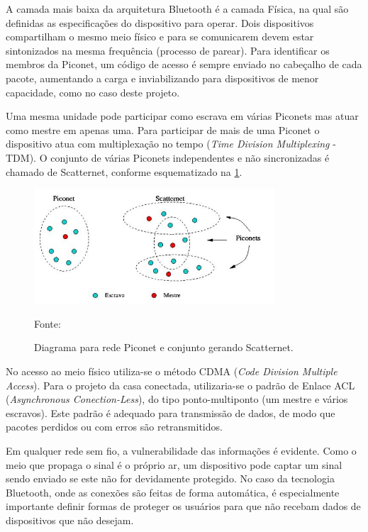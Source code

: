 A camada mais baixa da arquitetura Bluetooth é a camada Física, na qual são definidas as especificações do dispositivo para operar. Dois dispositivos compartilham o mesmo meio físico e para se comunicarem devem estar sintonizados na mesma frequência (processo de parear). Para identificar os membros da Piconet, um código de acesso é sempre enviado no cabeçalho de cada pacote, aumentando a carga e inviabilizando para dispositivos de menor capacidade, como no caso deste projeto. 

Uma mesma unidade pode participar como escrava em várias Piconets mas atuar como mestre em apenas uma. Para participar de mais de uma Piconet o dispositivo atua com multiplexação no tempo (\textit{Time Division Multiplexing} - TDM). O conjunto de várias Piconets independentes e não sincronizadas é chamado de Scatternet, conforme esquematizado na \ref{fig:redesbluetooth}.

\begin{figure}[h]
	\centering
	\caption{Diagrama para rede Piconet e conjunto gerando Scatternet.}
  \includegraphics[width=0.8\textwidth]{imagens/redesbluetooth.jpg}
  \label{fig:redesbluetooth}
  
  Fonte: \cite{redesbluetooth}
\end{figure}

No acesso ao meio físico utiliza-se o método CDMA (\textit{Code Division Multiple Access}). Para o projeto da casa conectada, utilizaria-se o padrão de Enlace ACL (\textit{Asynchronous Conection-Less}), do tipo ponto-multiponto (um mestre e vários escravos). Este padrão é adequado para transmissão de dados, de modo que pacotes perdidos ou com erros são retransmitidos. 

Em qualquer rede sem fio, a vulnerabilidade das informações é evidente. Como o meio que propaga o sinal é o próprio ar, um dispositivo pode captar um sinal sendo enviado se este não for devidamente protegido. No caso da tecnologia Bluetooth, onde as conexões são feitas de forma automática, é especialmente importante definir formas de proteger os usuários para que não recebam dados de dispositivos que não desejam.


